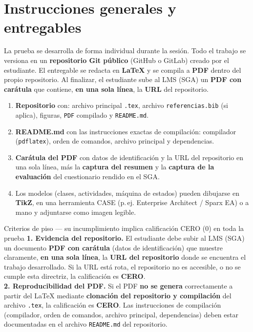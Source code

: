 \documentclass[11pt,a4paper,oneside]{article}
\begin{document}
	\section{Instrucciones generales y entregables}
	
	La prueba se desarrolla de forma individual durante la sesi\'on. Todo el trabajo se versiona en un \textbf{repositorio Git p\'ublico} (GitHub o GitLab) creado por el estudiante. El entregable se redacta en \textbf{LaTeX} y se compila a \textbf{PDF} dentro del propio repositorio. Al finalizar, el estudiante sube al LMS (SGA) un \textbf{PDF con car\'atula} que contiene, \textbf{en una sola l\'inea}, la \textbf{URL} del repositorio.
	
	\begin{enumerate}[leftmargin=1.4em,itemsep=1pt,topsep=2pt]
		\item \textbf{Repositorio} con: archivo principal \texttt{.tex}, archivo \texttt{referencias.bib} (si aplica), figuras, \texttt{PDF} compilado y \texttt{README.md}.
		\item \textbf{README.md} con las instrucciones exactas de compilaci\'on: compilador (\texttt{pdflatex}), orden de comandos, archivo principal y dependencias.
		\item \textbf{Car\'atula del PDF} con datos de identificaci\'on y la URL del repositorio en una sola l\'inea, m\'as la \textbf{captura del resumen} y la \textbf{captura de la evaluaci\'on} del cuestionario rendido en el SGA.
		\item Los modelos (clases, actividades, m\'aquina de estados) pueden dibujarse en \textbf{TikZ}, en una herramienta CASE (p.\,ej. Enterprise Architect / Sparx EA) o a mano y adjuntarse como imagen legible.
	\end{enumerate}
	
	\begin{piso}{Criterios de piso --- su incumplimiento implica calificaci\'on CERO (0) en toda la prueba}
		\textbf{1. Evidencia del repositorio.} El estudiante debe subir al LMS (SGA) un documento \textbf{PDF con car\'atula} (datos de identificaci\'on) que muestre claramente, \textbf{en una sola l\'inea}, la \textbf{URL del repositorio} donde se encuentra el trabajo desarrollado. Si la URL est\'a rota, el repositorio no es accesible, o no se cumple esta directriz, la calificaci\'on es \textbf{CERO}.\\[3pt]
		\textbf{2. Reproducibilidad del PDF.} Si el PDF \textbf{no se genera} correctamente a partir del LaTeX mediante \textbf{clonaci\'on del repositorio y compilaci\'on} del archivo \texttt{.tex}, la calificaci\'on es \textbf{CERO}. Las instrucciones de compilaci\'on (compilador, orden de comandos, archivo principal, dependencias) deben estar documentadas en el archivo \texttt{README.md} del repositorio.
	\end{piso}
	
\end{document}
